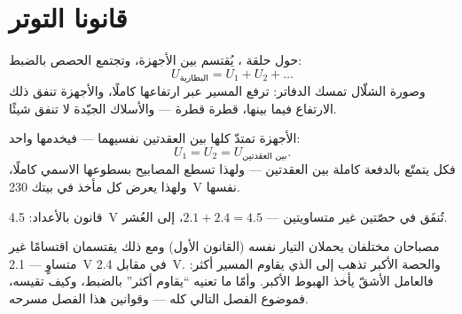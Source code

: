 \section{قانونا التوتر}

\begin{proposition}\label{prop:g8:circuit-laws:seriesU}
حول حلقة ، يُقتسم   بين الأجهزة، وتجتمع
الحصص بالضبط:
\[
U_{\text{البطارية}} = U_1 + U_2 + \dots
\]
وصورة الشلّال تمسك الدفاتر:  ترفع المسير عبر ارتفاعها
كاملًا، والأجهزة تنفق ذلك الارتفاع فيما بينها، قطرة قطرة ---
والأسلاك الجيّدة لا تنفق شيئًا.
\end{proposition}

\begin{proposition}\label{prop:g8:circuit-laws:parallelU}
الأجهزة  تمتدّ كلها بين العقدتين نفسيهما --- فيخدمها
 واحد:
\[
U_1 = U_2 = U_{\text{بين العقدتين}} .
\]
فكل  يتمتّع بالدفعة كاملة بين العقدتين --- ولهذا تسطع
المصابيح  بسطوعها الاسمي كاملًا، ولهذا يعرض كل مأخذ
في بيتك \qty{230}{V} نفسها.
\end{proposition}

\begin{omfigure}

{\small قانون   بالأعداد: \qty{4.5}{V}
 تُنفَق في حصّتين غير متساويتين --- $2.1 + 2.4 = 4.5$،
إلى العُشر.}
\end{omfigure}

\begin{example}\label{ex:g8:circuit-laws:unequal}
مصباحان مختلفان  يحملان التيار نفسه (القانون
الأول) ومع ذلك يقتسمان  اقتسامًا غير متساوٍ ---
\qty{2.1}{V} في مقابل \qty{2.4}{V}. والحصة الأكبر تذهب إلى
 الذي يقاوم المسير أكثر: فالعامل الأشقّ يأخذ الهبوط
الأكبر. وأمّا ما تعنيه ``يقاوم أكثر'' بالضبط، وكيف تقيسه،
فموضوع الفصل التالي كله --- وقوانين هذا الفصل مسرحه.
\end{example}

